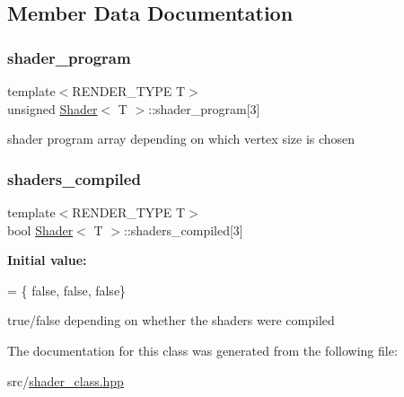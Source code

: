 \subsection{Member Data Documentation}
\mbox{\label{classShader_af8ec4edd2b1b56f32ce416280ff9b9e1}} 
\subsubsection{\texorpdfstring{shader\+\_\+program}{shader\_program}}
{\footnotesize\ttfamily template$<$R\+E\+N\+D\+E\+R\+\_\+\+T\+Y\+PE T$>$ \\
unsigned \mbox{\hyperlink{classShader}{Shader}}$<$ T $>$\+::shader\+\_\+program\mbox{[}3\mbox{]}\hspace{0.3cm}{\ttfamily [protected]}}

shader program array depending on which vertex size is chosen \mbox{\label{classShader_a057162ea090f838f7fbb658cb301efc4}} 
\subsubsection{\texorpdfstring{shaders\+\_\+compiled}{shaders\_compiled}}
{\footnotesize\ttfamily template$<$R\+E\+N\+D\+E\+R\+\_\+\+T\+Y\+PE T$>$ \\
bool \mbox{\hyperlink{classShader}{Shader}}$<$ T $>$\+::shaders\+\_\+compiled\mbox{[}3\mbox{]}\hspace{0.3cm}{\ttfamily [protected]}}

{\bfseries Initial value\+:}
\begin{DoxyCode}
= \{
        \textcolor{keyword}{false}, \textcolor{keyword}{false},
        \textcolor{keyword}{false}\}
\end{DoxyCode}
true/false depending on whether the shaders were compiled 

The documentation for this class was generated from the following file\+:\begin{DoxyCompactItemize}
\item 
src/\mbox{\hyperlink{shader__class_8hpp}{shader\+\_\+class.\+hpp}}\end{DoxyCompactItemize}
